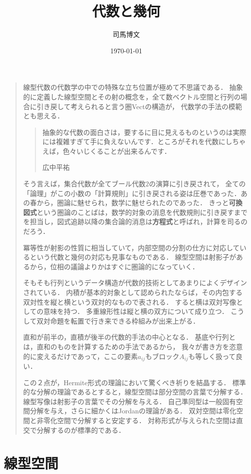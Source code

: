 \documentclass[uplatex, dvipdfmx]{jsreport}
\title{代数と幾何}
\author{司馬博文}
\date{\today}
\begin{document}
\tableofcontents

\begin{quotation}
    線型代数の代数学の中での特殊な立ち位置が極めて不思議である．
    抽象的に定義した線型空間とその射の概念を，全て数ベクトル空間と行列の場合に引き戻して考えられると言う圏Vectの構造が，
    代数学の手法の模範とも思える．
    \begin{quote}
        抽象的な代数の面白さは，要するに目に見えるものというのは実際には複雑すぎて手に負えないんです．ところがそれを代数にしちゃえば，色々いじくることが出来るんです．
        \begin{flushright}
            広中平祐
        \end{flushright}
    \end{quote}
    そう言えば，集合代数が全てブール代数$2$の演算に引き戻されて，
    全ての「論理」がこの小数の「計算規則」に引き戻される姿は圧巻であった．あの春から，圏論に魅せられ，数学に魅せられたのであった．
    きっと\textbf{可換図式}という圏論のことばは，数学的対象の消息を代数規則に引き戻すまでを担当し，図式追跡以降の集合論的消息は\textbf{方程式}と呼ばれ，計算を司るのだろう．

    冪等性が射影の性質に相当していて，内部空間の分割の仕方に対応しているという代数と幾何の対応も見事なものである．
    線型空間は射影子があるから，位相の議論よりかはすぐに圏論的になっていく．

    そもそも行列というデータ構造が代数的技術としてあまりによくデザインされている．
    内積が基本的対象として認められたならば，その内包する双対性を縦と横という双対的なもので表される．
    すると横は双対写像としての意味を持つ．
    多重線形性は縦と横の双方について成り立つ．
    こうして双対命題を転置で行き来できる枠組みが出来上がる．

    直和が前半の，直積が後半の代数的手法の中心となる．
    基底や行列とは，直和のものを計算するための手法であるから，
    我々が書き方を恣意的に変えるだけであって，ここの要素$a_{ij}$もブロック$A_{ij}$も等しく扱って良い．

    この２点が，Hermite形式の理論において驚くべき祈りを結晶する．
    標準的な分解の理論であるとすると，線型空間は部分空間の言葉で分解する．
    線型写像は射影子の言葉でその分解を与える．
    自己準同型は一般固有空間分解を与え，さらに細かくはJordanの理論がある．
    双対空間は零化空間と非零化空間で分解すると安定する．
    対称形式が与えられた空間は直交で分解するのが標準的である．
\end{quotation}

\chapter{線型空間}
\end{document}
